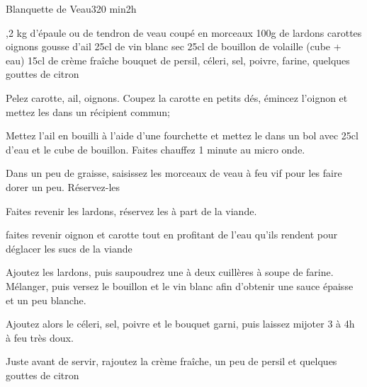 \begin{recette}{Blanquette de Veau}{3}{20 min}{2h}
\begin{ingredients}
,2 kg d'épaule ou de tendron de veau coupé en morceaux
\ingredient 100g de lardons
 carottes
 oignons
 gousse d'ail
\ingredient 25cl de vin blanc sec
\ingredient 25cl de bouillon de volaille (cube + eau)
\ingredient 15cl de crème fraîche
 bouquet de persil, céleri, sel, poivre, farine, quelques gouttes de citron
\end{ingredients}

\begin{preparation}
\etape Pelez carotte, ail, oignons. Coupez la carotte en petits dés, émincez l'oignon et mettez les dans un récipient commun;

\etape Mettez l'ail en bouilli à l'aide d'une fourchette et mettez le dans un bol avec 25cl d'eau et le cube de bouillon. 
Faites chauffez 1 minute au micro onde.

\etape Dans un peu de graisse, saisissez les morceaux de veau à feu vif pour les faire dorer un peu. Réservez-les

\etape Faites revenir les lardons, réservez les à part de la viande. 

\etape faites revenir oignon et carotte tout en profitant de l'eau qu'ils rendent pour déglacer les sucs de la viande

\etape Ajoutez les lardons, puis saupoudrez une à deux cuillères à soupe de farine. Mélanger, puis versez le bouillon et le vin 
blanc afin d'obtenir une sauce épaisse et un peu blanche. 

\etape Ajoutez alors le céleri, sel, poivre et le bouquet garni, puis laissez mijoter 3 à 4h à feu très doux. 

\etape Juste avant de servir, rajoutez la crème fraîche, un peu de persil et quelques gouttes de citron
\end{preparation}
\end{recette}

